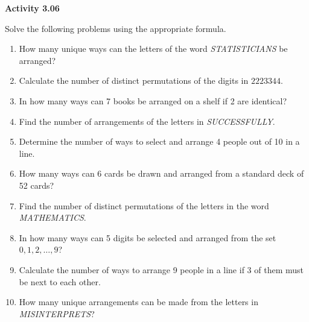 \vspace{0.3ex}
\noindent\textbf{Activity 3.06}

\vspace{0.2ex}

Solve the following problems using the appropriate formula.

\begin{enumerate}[label=\color{blue}\arabic*.]
    \item How many unique ways can the letters of the word \textit{STATISTICIANS} be arranged?
    \item Calculate the number of distinct permutations of the digits in \(2223344\).
    \item In how many ways can 7 books be arranged on a shelf if 2 are identical?
    \item Find the number of arrangements of the letters in \textit{SUCCESSFULLY}.
    \item Determine the number of ways to select and arrange 4 people out of 10 in a line.
    \item How many ways can 6 cards be drawn and arranged from a standard deck of 52 cards?
    \item Find the number of distinct permutations of the letters in the word \textit{MATHEMATICS}.
    \item In how many ways can 5 digits be selected and arranged from the set \(0, 1, 2, \ldots, 9\)?
    \item Calculate the number of ways to arrange 9 people in a line if 3 of them must be next to each other.
    \item How many unique arrangements can be made from the letters in \textit{MISINTERPRETS}?
\end{enumerate}
